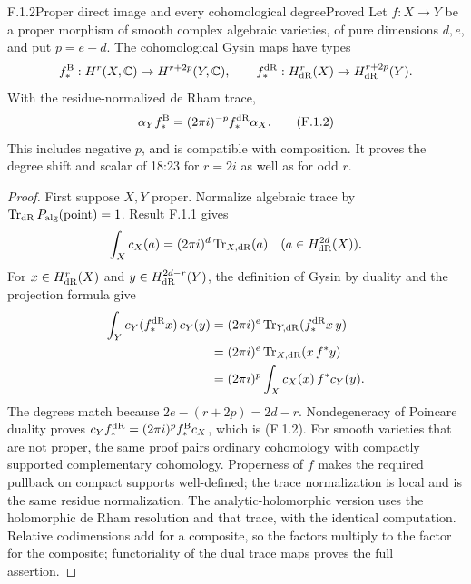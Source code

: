 \begin{result}{F.1.2}{Proper direct image and every cohomological degree}{Proved}
Let $f:X\to Y$ be a proper morphism of smooth complex algebraic varieties, of pure dimensions $d,e$, and put $p=e-d$. The cohomological Gysin maps have types
\[
 f_*^{\mathrm B}:H^r(X,\mathbb C)\to H^{r+2p}(Y,\mathbb C),\qquad
 f_*^{\mathrm{dR}}:H^r_{\mathrm{dR}}(X)\to H^{r+2p}_{\mathrm{dR}}(Y).
\]
With the residue-normalized de Rham trace,
\[
 \alpha_Y f_*^{\mathrm B}=(2\pi i)^{-p}f_*^{\mathrm{dR}}\alpha_X.
 \tag{F.1.2}
\]
This includes negative $p$, and is compatible with composition. It proves the degree shift and scalar of 18:23 for $r=2i$ as well as for odd $r$.
\end{result}
\begin{proof}
First suppose $X,Y$ proper. Normalize algebraic trace by $\operatorname{Tr}_{\mathrm{dR}}P_{\mathrm{alg}}(\mathrm{point})=1$. Result F.1.1 gives
\[
 \int_X c_X(a)=(2\pi i)^d\operatorname{Tr}_{X,\mathrm{dR}}(a)
 \quad(a\in H^{2d}_{\mathrm{dR}}(X)).
\]
For $x\in H^r_{\mathrm{dR}}(X)$ and $y\in H^{2d-r}_{\mathrm{dR}}(Y)$, the definition of Gysin by duality and the projection formula give
\begin{align*}
 \int_Y c_Y(f_*^{\mathrm{dR}}x)\,c_Y(y)
  &=(2\pi i)^e\operatorname{Tr}_{Y,\mathrm{dR}}(f_*^{\mathrm{dR}}x\,y)\\
  &=(2\pi i)^e\operatorname{Tr}_{X,\mathrm{dR}}(x\,f^*y)\\
  &=(2\pi i)^p\int_X c_X(x)\,f^*c_Y(y).
\end{align*}
The degrees match because $2e-(r+2p)=2d-r$. Nondegeneracy of Poincare duality proves $c_Yf_*^{\mathrm{dR}}=(2\pi i)^pf_*^{\mathrm B}c_X$, which is (F.1.2). For smooth varieties that are not proper, the same proof pairs ordinary cohomology with compactly supported complementary cohomology. Properness of $f$ makes the required pullback on compact supports well-defined; the trace normalization is local and is the same residue normalization. The analytic-holomorphic version uses the holomorphic de Rham resolution and that trace, with the identical computation. Relative codimensions add for a composite, so the factors multiply to the factor for the composite; functoriality of the dual trace maps proves the full assertion.
\end{proof}


